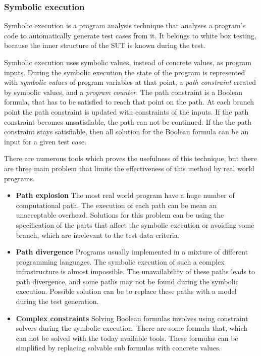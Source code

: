 
\subsubsection{Symbolic execution}
\label{ssub:symbolicexecution}

Symbolic execution is a program analysis technique that analyses a program’s code to automatically generate test cases from it. It belongs to white box testing, because the inner structure of the SUT is known during the test.

Symbolic execution uses symbolic values, instead of concrete values, as program inputs. During the symbolic execution the state of the program is represented with \textit{symbolic values} of program variables at that point, a \textit{path constraint} created by symbolic values, and a \textit{program counter}. The path constraint is a Boolean formula, that has to be satisfied to reach that point on the path. At each branch point the path constraint is updated with constraints of the inputs. If the path constraint becomes unsatisfiable, the path can not be continued. If the the path constraint stays satisfiable, then all solution for the Boolean formula can be an input for a given test case.

There are numerous tools which proves the usefulness of this technique, but there are three main problem that limits the effectiveness of this method by real world programs.

\begin{itemize}
	\item \textbf{Path explosion} The most real world program have a huge number of computational path. The execution of each path can be mean an unacceptable overhead. Solutions for this problem can be using the specification of the parts that affect the symbolic execution or avoiding some branch, which are irrelevant to the test data criteria.
	\item \textbf{Path divergence} Programs usually implemented in a mixture of different programming languages. The symbolic execution of such a complex infrastructure is almost impossible. The unavailability of these paths leads to path divergence, and some paths may not be found during the symbolic execution. Possible solution can be to replace these paths with a model during the test generation.
	\item \textbf{Complex constraints} Solving Boolean formulas involves using constraint solvers during the symbolic execution. There are some formula that, which can not be solved with the today available tools. These formulas can be simplified by replacing solvable sub formulas with concrete values.
\end{itemize}

